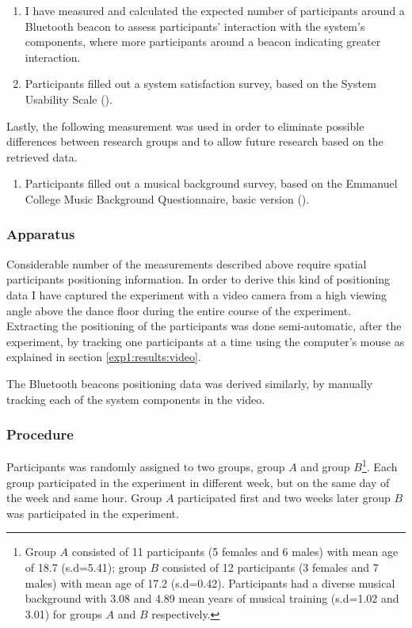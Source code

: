 \documentclass[a4paper,11pt]{article}
\begin{document}
{\begin{enumerate}[resume]
	\item \label{measure:system} I have measured and calculated the expected number of participants around a Bluetooth beacon to assess participants' interaction with the system's components, where more participants around a beacon indicating greater interaction.
	\item \label{measure:survey:usability} Participants filled out a system satisfaction survey, based on the System Usability Scale (\cite{brooke96}).
\end{enumerate}
Lastly, the following measurement was used in order to eliminate possible differences between research groups and to allow future research based on the retrieved data.
\begin{enumerate}[resume]
	\item \label{measure:survey:musical} Participants filled out a musical background survey, based on the Emmanuel College Music Background Questionnaire, basic version (\cite{web:zhao12}).
\end{enumerate}

\subsubsection{Apparatus}\label{aparatus}

Considerable number of the measurements described above require spatial participants positioning information.
In order to derive this kind of positioning data I have captured the experiment with a video camera from a high viewing angle above the dance floor during the entire course of the experiment.
Extracting the positioning of the participants was done semi-automatic, after the experiment, by tracking one participants at a time using the computer's mouse as explained in section \ref{exp1:results:video}.

The Bluetooth beacons positioning data was derived similarly, by manually tracking each of the system components in the video.

\subsubsection{Procedure}

Participants was randomly assigned to two groups, group $A$ and group $B$\@\footnote{Group $A$ consisted of 11 participants (5 females and 6 males) with mean age of 18.7 (s.d=5.41); group $B$ consisted of 12 participants (3 females and 7 males) with mean age of 17.2 (s.d=0.42). Participants had a diverse musical background with 3.08 and 4.89 mean years of musical training (s.d=1.02 and 3.01) for groups $A$ and $B$ respectively.}.
Each group participated in the experiment in different week, but on the same day of the week and same hour. Group $A$ participated first and two weeks later group $B$ was participated in the experiment.

}
\end{document}
